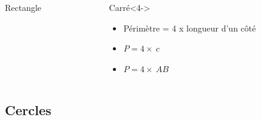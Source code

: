 \documentclass[xcolor=table]{beamer}
\begin{document}
\begin{frame}
\begin{columns}[onlytextwidth]
\begin{column}{0.35\textwidth}
\begin{alertblock}{Rectangle}
			\end{alertblock}
		\end{column}
		\begin{column}{0.25\textwidth}
			\begin{alertblock}{Carré}<4->
				\begin{itemize}
					\item Périmètre = 4 x longueur d'un côté
					\item $P = 4 \times\ c $
					\item $P = 4 \times\ AB $
				\end{itemize}
				
			\end{alertblock}
		\end{column}
	\end{columns}
\end{frame}

\subsection{Cercles}	
\end{document}
